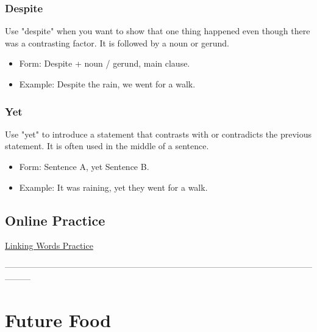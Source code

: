 \subsubsection{Despite}
Use "despite" when you want to show that one thing happened even though there was a contrasting factor. It is followed by a noun or gerund.
\begin{itemize}
    \item Form: Despite + noun / gerund, main clause.
    \item Example: Despite the rain, we went for a walk.
\end{itemize}


\subsubsection{Yet}
Use "yet" to introduce a statement that contrasts with or contradicts the previous statement. It is often used in the middle of a sentence.
\begin{itemize}
    \item Form: Sentence A, yet Sentence B.
    \item Example: It was raining, yet they went for a walk.
\end{itemize}


\subsection{Online Practice}

\href{https://wordwall.net/en-gb/community/linking-words}{Linking Words Practice}



---------------------------------------------------------------------------------------------------------------------


\section{Future Food}

